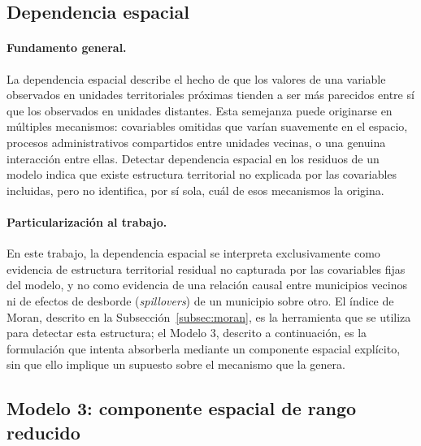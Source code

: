 \subsection{Dependencia espacial}
\label{subsec:dependencia-espacial}

\paragraph{Fundamento general.}
La dependencia espacial describe el hecho de que los valores de una variable observados en unidades territoriales próximas tienden a ser más parecidos entre sí que los observados en unidades distantes. Esta semejanza puede originarse en múltiples mecanismos: covariables omitidas que varían suavemente en el espacio, procesos administrativos compartidos entre unidades vecinas, o una genuina interacción entre ellas. Detectar dependencia espacial en los residuos de un modelo indica que existe estructura territorial no explicada por las covariables incluidas, pero no identifica, por sí sola, cuál de esos mecanismos la origina.

\paragraph{Particularización al trabajo.}
En este trabajo, la dependencia espacial se interpreta exclusivamente como evidencia de estructura territorial residual no capturada por las covariables fijas del modelo, y no como evidencia de una relación causal entre municipios vecinos ni de efectos de desborde (\emph{spillovers}) de un municipio sobre otro. El índice de Moran, descrito en la Subsección~\ref{subsec:moran}, es la herramienta que se utiliza para detectar esta estructura; el Modelo 3, descrito a continuación, es la formulación que intenta absorberla mediante un componente espacial explícito, sin que ello implique un supuesto sobre el mecanismo que la genera.

\subsection{Modelo 3: componente espacial de rango reducido}
\label{subsec:car}

